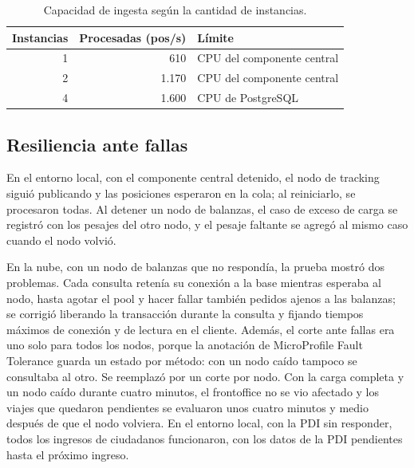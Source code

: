 \begin{table}
\caption{Capacidad de ingesta según la cantidad de instancias.}\label{tab:escalado}
\centering
\begin{tabular}{|r|r|l|}
\hline
Instancias & Procesadas (pos/s) & Límite \\
\hline
1 & 610 & CPU del componente central \\
\hline
2 & 1.170 & CPU del componente central \\
\hline
4 & 1.600 & CPU de PostgreSQL \\
\hline
\end{tabular}
\end{table}

\subsection{Resiliencia ante fallas}
En el entorno local, con el componente central detenido, el nodo de tracking siguió publicando y las posiciones esperaron en la cola; al reiniciarlo, se procesaron todas. Al detener un nodo de balanzas, el caso de exceso de carga se registró con los pesajes del otro nodo, y el pesaje faltante se agregó al mismo caso cuando el nodo volvió.

En la nube, con un nodo de balanzas que no respondía, la prueba mostró dos problemas. Cada consulta retenía su conexión a la base mientras esperaba al nodo, hasta agotar el pool y hacer fallar también pedidos ajenos a las balanzas; se corrigió liberando la transacción durante la consulta y fijando tiempos máximos de conexión y de lectura en el cliente. Además, el corte ante fallas era uno solo para todos los nodos, porque la anotación de MicroProfile Fault Tolerance guarda un estado por método: con un nodo caído tampoco se consultaba al otro. Se reemplazó por un corte por nodo. Con la carga completa y un nodo caído durante cuatro minutos, el frontoffice no se vio afectado y los viajes que quedaron pendientes se evaluaron unos cuatro minutos y medio después de que el nodo volviera. En el entorno local, con la PDI sin responder, todos los ingresos de ciudadanos funcionaron, con los datos de la PDI pendientes hasta el próximo ingreso.

